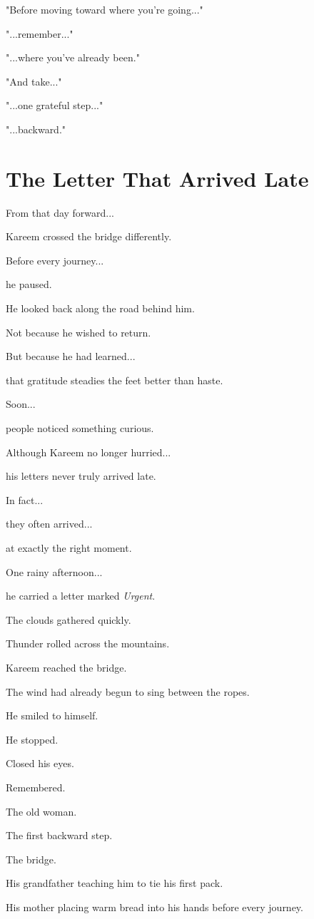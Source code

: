 \documentclass[12pt,openany]{book}
\begin{document}
"Before moving toward where you're going..."

"...remember..."

"...where you've already been."

"And take..."

"...one grateful step..."

"...backward."
\section*{The Letter That Arrived Late}

From that day forward...

Kareem crossed the bridge differently.

Before every journey...

he paused.

He looked back along the road behind him.

Not because he wished to return.

But because he had learned...

that gratitude steadies the feet better than haste.

Soon...

people noticed something curious.

Although Kareem no longer hurried...

his letters never truly arrived late.

In fact...

they often arrived...

at exactly the right moment.

One rainy afternoon...

he carried a letter marked \emph{Urgent}.

The clouds gathered quickly.

Thunder rolled across the mountains.

Kareem reached the bridge.

The wind had already begun to sing between the ropes.

He smiled to himself.

He stopped.

Closed his eyes.

Remembered.

The old woman.

The first backward step.

The bridge.

His grandfather teaching him to tie his first pack.

His mother placing warm bread into his hands before every journey.
\end{document}
